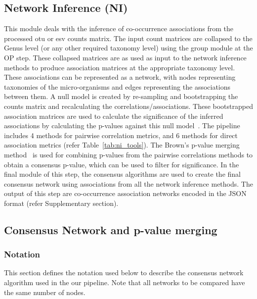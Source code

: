   \subsection*{Network Inference (NI)}
  \vspace{-5mm}
  This module deals with the inference of co-occurrence associations from the processed \ac{otu} or \ac{esv} counts matrix.
  The input count matrices are collapsed to the Genus level (or any other required taxonomy level) using the group module at the OP step.
  These collapsed matrices are as used as input to the network inference methods to produce association matrices at the appropriate taxonomy level.
  These associations can be represented as a network, with nodes representing taxonomies of the micro-organisms and edges representing the associations between them.
  A null model is created by re-sampling and bootstrapping the counts matrix and recalculating the correlations/associations.
  These bootstrapped association matrices are used to calculate the significance of the inferred associations by calculating the p-values against this null model~\cite{Watts2018}.
  The pipeline includes 4 methods for pairwise correlation metrics, and 6 methods for direct association metrics (refer Table~\ref{tab:ni_tools}).
  The Brown's p-value merging method~\cite{brown_400_1975} is used for combining p-values from the pairwise correlations methods to obtain a consensus p-value, which can be used to filter for significance.
  In the final module of this step, the consensus algorithms are used to create the final consensus network using associations from all the network inference methods.
  The output of this step are co-occurrence association networks encoded in the JSON format (refer Supplementary section).

  \subsection*{Consensus Network and p-value merging}
  \vspace{-5mm}

 \subsubsection*{Notation}

  This section defines the notation used below to describe the consensus network algorithm used in the our pipeline. Note that all networks to be compared have the same number of nodes.

